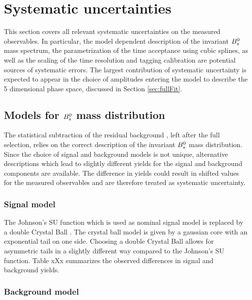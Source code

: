 \section{Systematic uncertainties}
\label{sec:Systematics}

This section covers all relevant systematic uncertainties on the measured observables.
In particular, the model dependent description of the invariant ${{B}^0_{s}}$ mass spectrum, the parametrization of the time acceptance using cubic splines, 
as well as the scaling of the time resolution and tagging calibration are potential sources of systematic errors. 
The largest contribution of systematic uncertainty is expected to appear in the choice of amplitudes entering the model to describe the 5 dimensional phase space, discussed in Section \ref{sec:fullFit}.

\subsection{Models for ${{B}^0_{s}}$ mass distribution}
\label{subsec:SystMass}

The statistical subtraction of the residual background \cite{Pivk:2004ty}, left after the full selection, relies on the correct description of the invariant ${{B}^0_{s}}$ mass distribution.
Since the choice of signal and background models is not unique, alternative descriptions which lead to slightly different yields for the signal and background components are available. 
The difference in yields could result in shifted values for the measured observables and are therefore treated as systematic uncertainty. \newline

\subsubsection{Signal model}

The Johnson's SU function which is used as nominal signal model is replaced by a double Crystal Ball \cite{CB}. 
The crystal ball model is given by a gaussian core with an exponential tail on one side. 
Choosing a double Crystal Ball allows for asymmetric tails in a slightly different way compared to the Johnson's SU function. 
Table xXx summarizes the observed differences in signal and background yields.

\subsubsection{Background model}

